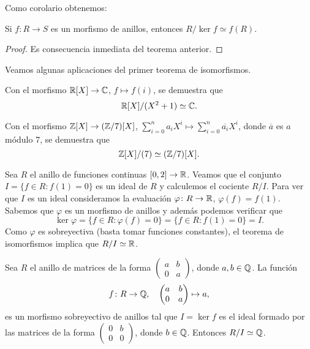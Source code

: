 Como corolario obtenemos:

\begin{corollary}
Si $f\colon R\to S$ es un morfismo de anillos, entonces $R/\ker f\simeq f(R)$. 
\end{corollary}

\begin{proof}
Es consecuencia inmediata del teorema anterior.
\end{proof}

Veamos algunas aplicaciones del primer teorema de isomorfismos. 


\begin{example}
Con el morfismo $\mathbb{R}[X]\to\mathbb{C}$, $f\mapsto f(i)$, se demuestra que 
\[
\mathbb{R}[X]/(X^2+1)\simeq\mathbb{C}.
\]  	
\end{example}

\begin{example}
Con el morfismo $\mathbb{Z}[X]\to(\mathbb{Z}/7)[X]$, $\sum_{i=0}^na_iX^i\mapsto \sum_{i=0}^n\overline{a_i}X^i$, donde $\overline{a}$ es $a$ módulo 7, se demuestra que
\[
\mathbb{Z}[X]/(7)\simeq (\mathbb{Z}/7)[X].
\]	
\end{example}

\begin{example}
Sea $R$ el anillo de funciones continuas $[0,2]\to\mathbb{R}$. Veamos que el conjunto $I=\{f\in R:f(1)=0\}$ es un ideal de $R$ y calculemos
el cociente $R/I$. Para ver que $I$ es un ideal
consideramos la evaluación $\varphi\colon R\to\mathbb{R}$, $\varphi(f)=f(1)$. Sabemos que $\varphi$ es un morfismo de anillos y además 
podemos verificar que
\[
\ker\varphi=\{f\in R:\varphi(f)=0\}=\{f\in R:f(1)=0\}=I.
\]
Como $\varphi$ es sobreyectiva (basta tomar funciones constantes), el teorema de isomorfismos implica que $R/I\simeq\mathbb{R}$.  	
\end{example}

\begin{example}
Sea $R$ el anillo de matrices de la forma $\begin{pmatrix}a&b\\0&a\end{pmatrix}$, donde $a,b\in\mathbb{Q}$. La función 
\[
f\colon R\to\mathbb{Q},
\quad
\begin{pmatrix}a&b\\0&a\end{pmatrix}\mapsto a,
\]
es un morfismo sobreyectivo de anillos tal que $I=\ker f$ es el ideal formado por las matrices de la forma
$\begin{pmatrix}0&b\\0&0\end{pmatrix}$, donde $b\in\mathbb{Q}$. Entonces $R/I\simeq\mathbb{Q}$.  
\end{example}

